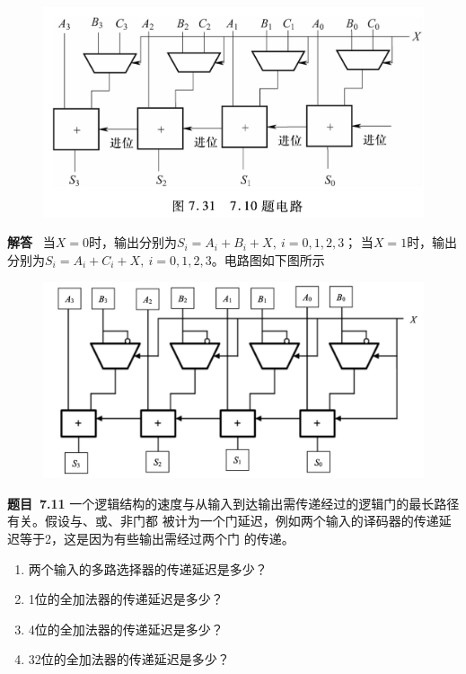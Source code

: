 \documentclass[10pt,a4paper,UTF8]{ctexart}
\newcommand{\problemname}{待定义}
\newenvironment{problem}{\begin{shaded}\par\noindent\textbf{题目\  \problemname}}{\end{shaded}\par}
\newenvironment{solution}{\par\noindent\textbf{解答}\ }{\par}
\begin{document}
\begin{figure}[H]
	\centering
	\includegraphics[scale=0.35]{img/7.10.png}
\end{figure}

\begin{solution}
	当$X=0$时，输出分别为$S_i=A_i+B_i+X,\ i=0,1,2,3$；
	当$X=1$时，输出分别为$S_i=A_i+C_i+X,\ i=0,1,2,3$。电路图如下图所示
	\begin{figure}[H]
		\centering
		\includegraphics[scale=0.3]{img/7.10a.png}
	\end{figure}

\end{solution}


\renewcommand{\problemname}{7.11}
\begin{problem}
	一个逻辑结构的速度与从输入到达输出需传递经过的逻辑门的最长路径有关。假设与、或、非门都
	被计为一个门延迟，例如两个输入的译码器的传递延迟等于2，这是因为有些输出需经过两个门
	的传递。
	\begin{enumerate}[(1)]
		\item 两个输入的多路选择器的传递延迟是多少？
		\item 1位的全加法器的传递延迟是多少？
		\item 4位的全加法器的传递延迟是多少？
		\item 32位的全加法器的传递延迟是多少？
	\end{enumerate}

\end{problem}
\end{document}
